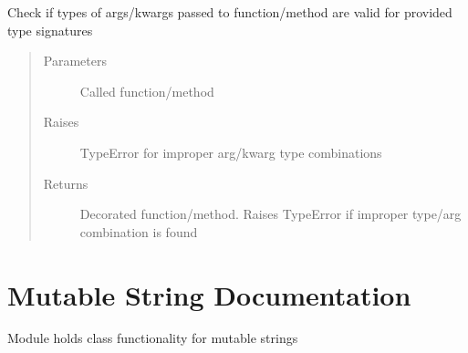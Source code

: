 \documentclass[letterpaper,10pt,english]{sphinxmanual}
\begin{document}
\begin{fulllineitems}
\label{\detokenize{api/type_checking:data_structures.type_checking.TypeChecker.__call__}}
Check if types of args/kwargs passed to function/method are valid for provided type signatures
\begin{quote}\begin{description}
\item[{Parameters}] \leavevmode
{} \textendash{} Called function/method

\item[{Raises}] \leavevmode
TypeError for improper arg/kwarg type combinations

\item[{Returns}] \leavevmode
Decorated function/method. Raises TypeError if improper type/arg combination is found

\end{description}\end{quote}

\end{fulllineitems}



\chapter{Mutable String Documentation}
\label{\detokenize{api/mutable_string:module-data_structures.mutable_string}}\label{\detokenize{api/mutable_string:mutable-string-documentation}}\label{\detokenize{api/mutable_string::doc}}
Module holds class functionality for mutable strings
\end{document}
